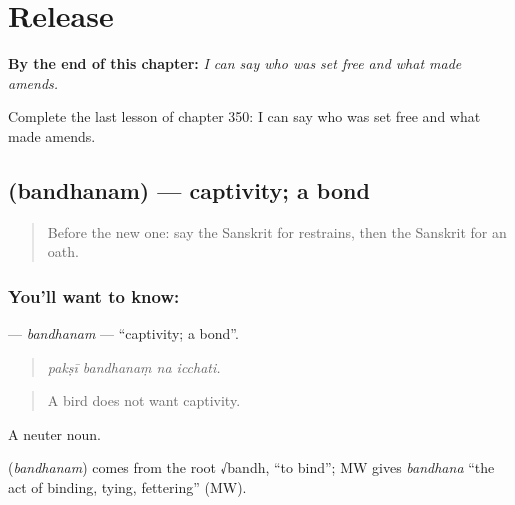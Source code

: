 
\chapter{Release}
\label{ch:sa-release}

\begin{chapteropening}
\textbf{By the end of this chapter:} \emph{I can say who was set free and what made amends.}

Complete the last lesson of chapter 350: I can say who was set free and what made amends.
\end{chapteropening}

\section[\texorpdfstring{\sk{बन्धनम्} (bandhanam)}{बन्धनम् (bandhanam)}]{ (bandhanam) — captivity; a bond}

\label{lesson:SA-C350-bandhanam}



\begin{quote}
Before the new one: say the Sanskrit for restrains, then the Sanskrit for an oath.
\end{quote}

\subsection*{You'll want to know: }
\textbf{} — \emph{bandhanam} — \textquotedblleft{}captivity; a bond\textquotedblright{}.

\begin{quote}
   
\end{quote}

\begin{quote}
\emph{pakṣī bandhanaṃ na icchati.}
\end{quote}

\begin{quote}
A bird does not want captivity.
\end{quote}

A neuter noun.

\begin{cousinweb}
\textbf{} (\emph{bandhanam}) comes from the root √bandh, \textquotedblleft{}to bind\textquotedblright{}; MW gives \emph{bandhana} \textquotedblleft{}the act of binding, tying, fettering\textquotedblright{} (MW).
\end{cousinweb}

